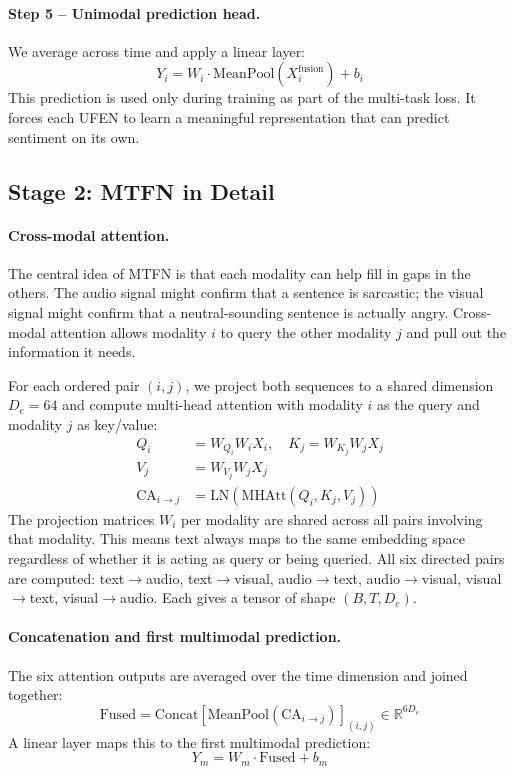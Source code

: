 \documentclass[11pt,twocolumn]{article}
\begin{document}
\paragraph{Step 5 -- Unimodal prediction head.}
We average across time and apply a linear layer:
\begin{equation}
Y_i = W_i \cdot \text{MeanPool}(X_i^{\text{fusion}}) + b_i
\end{equation}
This prediction is used only during training as part of the multi-task loss. It forces each UFEN to learn a meaningful representation that can predict sentiment on its own.

\subsection{Stage 2: MTFN in Detail}
\label{sec:mtfn}

\paragraph{Cross-modal attention.}
The central idea of MTFN is that each modality can help fill in gaps in the others. The audio signal might confirm that a sentence is sarcastic; the visual signal might confirm that a neutral-sounding sentence is actually angry. Cross-modal attention allows modality $i$ to query the other modality $j$ and pull out the information it needs.

For each ordered pair $(i, j)$, we project both sequences to a shared dimension $D_e = 64$ and compute multi-head attention with modality $i$ as the query and modality $j$ as key/value:
\begin{align}
Q_i &= W_{Q_i} W_i X_i, \quad K_j = W_{K_j} W_j X_j \nonumber\\
V_j &= W_{V_j} W_j X_j \\
\text{CA}_{i \to j} &= \text{LN}\!\left(\text{MHAtt}(Q_i, K_j, V_j)\right)
\end{align}
The projection matrices $W_i$ per modality are shared across all pairs involving that modality. This means text always maps to the same embedding space regardless of whether it is acting as query or being queried. All six directed pairs are computed: text$\to$audio, text$\to$visual, audio$\to$text, audio$\to$visual, visual$\to$text, visual$\to$audio. Each gives a tensor of shape $(B, T, D_e)$.

\paragraph{Concatenation and first multimodal prediction.}
The six attention outputs are averaged over the time dimension and joined together:
\begin{equation}
\text{Fused} = \text{Concat}\!\left[\text{MeanPool}(\text{CA}_{i \to j})\right]_{(i,j)} \in \mathbb{R}^{6 D_e}
\end{equation}
A linear layer maps this to the first multimodal prediction:
\begin{equation}
Y_m = W_m \cdot \text{Fused} + b_m
\end{equation}
\end{document}
